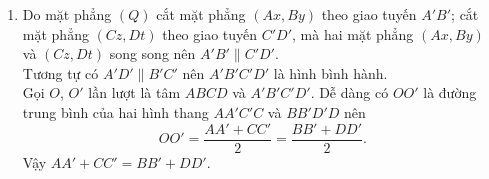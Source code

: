 \begin{bt}
{\begin{enumerate}
{}
			\item Do mặt phẳng $(Q)$ cắt mặt phẳng $(Ax,By)$ theo giao tuyến $A'B'$; cắt mặt phẳng $(Cz, Dt)$ theo giao tuyến $C'D'$, mà hai mặt phẳng $(Ax,By)$ và $(C z, D t)$ song song nên $A'B' \parallel C'D'$.\\
			Tương tự có $A'D' \parallel B'C'$ nên $A'B'C'D'$ là hình bình hành.\\
			Gọi $O$, $O'$ lần lượt là tâm $ABCD$ và $A'B'C'D'$. Dễ dàng có $OO'$ là đường trung bình của hai hình thang $AA'C'C$ và $BB'D'D$ nên
			$$ OO'=\dfrac{AA' + CC'}{2} = \dfrac{BB' + DD'}{2}.$$
			Vậy $AA' + CC'=BB' + DD'$.
		\end{enumerate}
	}
\end{bt}


